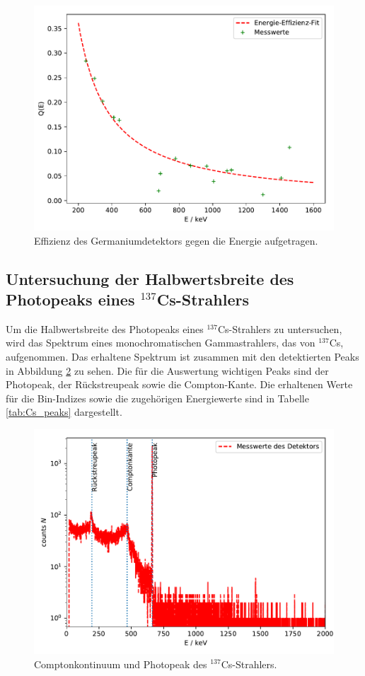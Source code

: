 \FloatBarrier
\begin{figure}
    \centering
    \includegraphics[scale=0.7]{effizienz.pdf}
    \caption{Effizienz des Germaniumdetektors gegen die Energie aufgetragen.}
    \label{abb:effizienz}
\end{figure}
\FloatBarrier

\subsection{Untersuchung der Halbwertsbreite des Photopeaks eines $^{137}$Cs-Strahlers}

Um die Halbwertsbreite des Photopeaks eines $^{137}$Cs-Strahlers zu untersuchen,
wird das Spektrum eines monochromatischen Gammastrahlers, das von $^{137}$Cs,
aufgenommen. Das erhaltene Spektrum ist zusammen mit den detektierten Peaks in
Abbildung \ref{abb:Cs_peaks} zu sehen. Die für die Auswertung wichtigen Peaks sind der
Photopeak, der Rückstreupeak sowie die Compton-Kante. Die erhaltenen Werte für die
Bin-Indizes sowie die zugehörigen Energiewerte sind in Tabelle \ref{tab:Cs_peaks}
dargestellt.

\FloatBarrier
\begin{figure}
    \centering
    \includegraphics[scale=0.7]{Cs_fit.pdf}
    \caption{Comptonkontinuum und Photopeak des $^{137}$Cs-Strahlers.}
    \label{abb:Cs_peaks}
\end{figure}
\FloatBarrier


